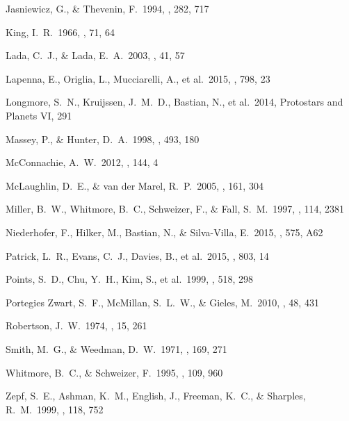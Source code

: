 \documentclass[useAMS,usenatbib]{mn2e}
\begin{document}
\begin{thebibliography}{99}
 Jasniewicz, G., \& Thevenin, F.\ 1994, \aap, 282, 717

 King, I.~R.\ 1966, \aj, 71, 64

 Lada, C.~J., \& Lada, E.~A.\ 2003, \araa, 41, 57

 Lapenna, E., Origlia,
L., Mucciarelli, A., et al.\ 2015, \apj, 798, 23

 Longmore, S.~N.,
Kruijssen, J.~M.~D., Bastian, N., et al.\ 2014, Protostars and Planets VI,
291

 Massey, P., \& Hunter, D.~A.\ 1998, \apj, 493, 180

 McConnachie, A.~W.\ 2012,
\aj, 144, 4

 McLaughlin, D.~E., \& van der Marel, R.~P.\ 2005, \apjs, 161, 304

 Miller, B.~W., Whitmore,
B.~C., Schweizer, F., \& Fall, S.~M.\ 1997, \aj, 114, 2381

 Niederhofer, F., Hilker, M., Bastian, N., \& Silva-Villa, E.\ 2015, \aap, 575, A62

 Patrick, L.~R., Evans,
C.~J., Davies, B., et al.\ 2015, \apj, 803, 14

 Points, S.~D., Chu,
Y.~H., Kim, S., et al.\ 1999, \apj, 518, 298

 Portegies Zwart, S.~F., McMillan, S.~L.~W., \& Gieles, M.\ 2010, \araa, 48, 431

 Robertson, J.~W.\ 1974, \aaps, 15, 261

 Smith, M.~G., \& Weedman, D.~W.\ 1971, \apj, 169, 271

 Whitmore, B.~C., \& Schweizer, F.\ 1995, \aj, 109, 960

 Zepf, S.~E., Ashman,
K.~M., English, J., Freeman, K.~C., \& Sharples, R.~M.\ 1999, \aj, 118, 752
\end{thebibliography}
\label{lastpage}
\end{document}
